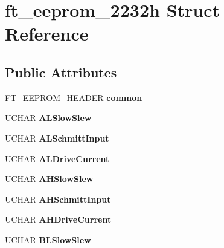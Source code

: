 \hypertarget{structft__eeprom__2232h}{}\section{ft\+\_\+eeprom\+\_\+2232h Struct Reference}
\label{structft__eeprom__2232h}
\subsection*{Public Attributes}
\begin{DoxyCompactItemize}
\item 
\mbox{\label{structft__eeprom__2232h_a9b818fef5106306f0fb8456979164d4e}} 
\hyperlink{structft__eeprom__header}{F\+T\+\_\+\+E\+E\+P\+R\+O\+M\+\_\+\+H\+E\+A\+D\+ER} {\bfseries common}
\item 
\mbox{\label{structft__eeprom__2232h_a202255f5052272a7807e17fd5d580438}} 
U\+C\+H\+AR {\bfseries A\+L\+Slow\+Slew}
\item 
\mbox{\label{structft__eeprom__2232h_aabf6af90bb51868803bb93b09f45d6fd}} 
U\+C\+H\+AR {\bfseries A\+L\+Schmitt\+Input}
\item 
\mbox{\label{structft__eeprom__2232h_add083043190baacddfb71891e65f0e35}} 
U\+C\+H\+AR {\bfseries A\+L\+Drive\+Current}
\item 
\mbox{\label{structft__eeprom__2232h_acfcd2fc032788785109a3f6cf48541a9}} 
U\+C\+H\+AR {\bfseries A\+H\+Slow\+Slew}
\item 
\mbox{\label{structft__eeprom__2232h_abeb4cedf9e0a7ff67cba78e20d1c9c53}} 
U\+C\+H\+AR {\bfseries A\+H\+Schmitt\+Input}
\item 
\mbox{\label{structft__eeprom__2232h_a66a0e83f79b8ab08e2b7ae6dad6a6ab9}} 
U\+C\+H\+AR {\bfseries A\+H\+Drive\+Current}
\item 
\mbox{\label{structft__eeprom__2232h_ac04377c073041676bf56e25152572952}} 
U\+C\+H\+AR {\bfseries B\+L\+Slow\+Slew}
\item 
\mbox{\label{structft__eeprom__2232h_a5f44424e437a8f95a08123f35c813e17}} 

\end{DoxyCompactItemize}
